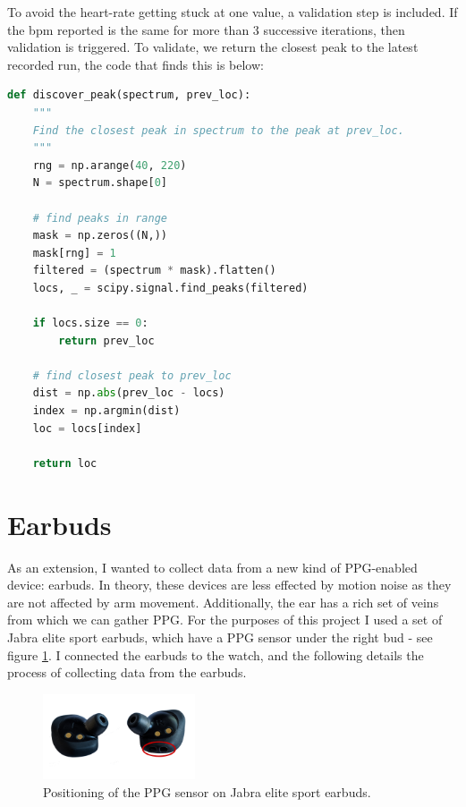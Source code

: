 \documentclass[12pt,a4paper,twoside,openright]{report}
\begin{document}
To avoid the heart-rate getting stuck at one value, a validation step is
included. If the bpm reported is the same for more than 3 successive
iterations, then
validation is triggered. To validate, we return the closest peak to the latest
recorded run, the code that finds this is below:

\begin{lstlisting}[language=Python]
def discover_peak(spectrum, prev_loc):
    """
    Find the closest peak in spectrum to the peak at prev_loc.
    """
    rng = np.arange(40, 220)
    N = spectrum.shape[0]

    # find peaks in range
    mask = np.zeros((N,))
    mask[rng] = 1
    filtered = (spectrum * mask).flatten()
    locs, _ = scipy.signal.find_peaks(filtered)

    if locs.size == 0:
        return prev_loc

    # find closest peak to prev_loc
    dist = np.abs(prev_loc - locs)
    index = np.argmin(dist)
    loc = locs[index]

    return loc
\end{lstlisting}

\section{Earbuds}

As an extension, I wanted to collect data from a new kind of PPG-enabled
device: earbuds. In theory, these devices are less effected by motion noise
as they are not affected by arm movement. Additionally, the ear has a rich set
of veins from which we can gather PPG. For the purposes of this project I used
a set of Jabra elite sport earbuds, which have a PPG sensor under the right
bud - see figure \ref{fig:jabra}. I connected the earbuds to the watch, and
the following details the process of collecting data from the earbuds.

\begin{figure}[tbh]
	\centerline{\includegraphics[width=0.4\textwidth]{figs/jabra.png}}
	\caption{Positioning of the PPG sensor on Jabra elite sport earbuds.}
	\label{fig:jabra}
\end{figure}
\end{document}
